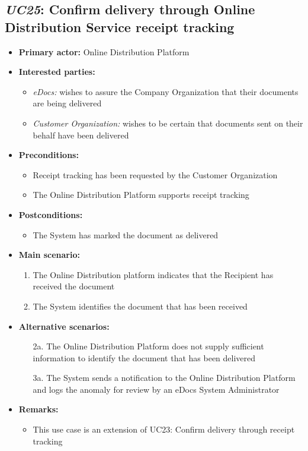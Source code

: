 \documentclass[a4paper,10pt]{article}
\begin{document}
\subsection{\emph{UC25}: Confirm delivery through Online Distribution Service receipt tracking}
\begin{itemize}
	\item \textbf{Primary actor:} Online Distribution Platform
	\item \textbf{Interested parties:} 
	\begin{itemize}
		\item \textit{eDocs:} wishes to assure the Company Organization that their documents are being delivered
		\item \textit{Customer Organization:} wishes to be certain that documents sent on their behalf have been delivered
	\end{itemize}
	
	\item \textbf{Preconditions:}
	\begin{itemize}
		\item Receipt tracking has been requested by the Customer Organization
		\item The Online Distribution Platform supports receipt tracking
	\end{itemize}
	
	\item \textbf{Postconditions:}
	\begin{itemize}
		\item The System has marked the document as delivered
	\end{itemize}
	
	\item \textbf{Main scenario:} 
	\begin{enumerate}
		\item The Online Distribution platform indicates that the Recipient has received the document
		\item The System identifies the document that has been received
	\end{enumerate}
	
	\item \textbf{Alternative scenarios:} 
	\begin{enumerate}
		\item [2a.] The Online Distribution Platform does not supply sufficient information to identify the document that has been delivered
		\item [3a.] The System sends a notification to the Online Distribution Platform and logs the anomaly for review by an eDocs System Administrator
	\end{enumerate}
	
	\item \textbf{Remarks:}
	\begin{itemize}
		\item This use case is an extension of UC23: Confirm delivery through receipt tracking
	\end{itemize}
\end{itemize}
\end{document}
